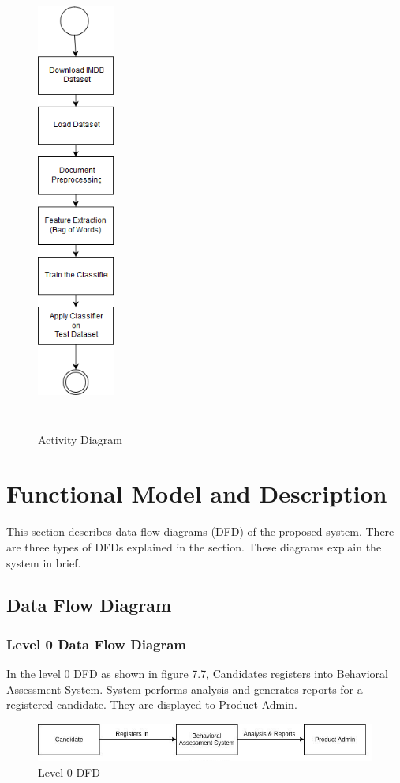 \documentclass[oneside,a4paper,12pt]{pictreport}
\begin{document}
\begin{figure}[h!]
\begin{center}
 

\includegraphics[width=1.0in,height=6.0in]{Activity.png}
\caption{Activity Diagram}
\end{center}

\end{figure}
\newpage
\section{Functional Model and Description}
This section describes data flow diagrams (DFD) of the proposed system. There are three types of DFDs explained in the section. These diagrams explain the system in brief.

\subsection{Data Flow Diagram}
\subsubsection{Level 0 Data Flow Diagram}
In the level 0 DFD as shown in figure 7.7, Candidates registers into Behavioral Assessment System. System performs analysis and generates reports for a registered candidate. They are displayed to Product Admin.\\
\begin{figure}[h!]
\includegraphics[width=4.5in]{DFD-0.jpg}
\caption{Level 0 DFD}
\end{figure}
\end{document}
